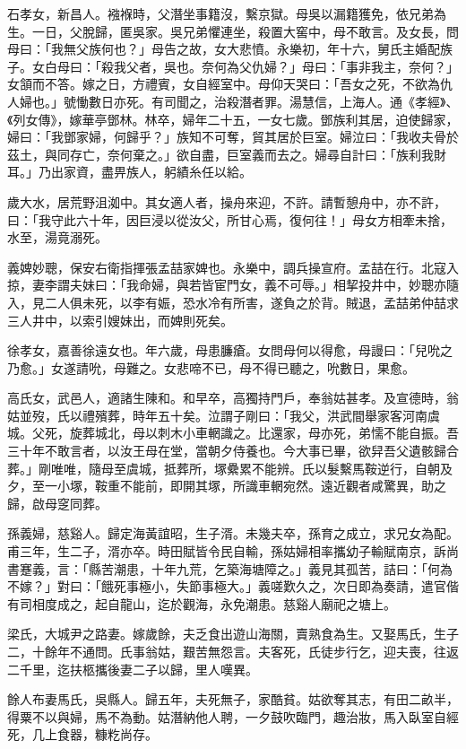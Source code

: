 \begin{pinyinscope}
石孝女，新昌人。襁褓時，父潛坐事籍沒，繫京獄。母吳以漏籍獲免，依兄弟為生。一日，父脫歸，匿吳家。吳兄弟懼連坐，殺置大窖中，母不敢言。及女長，問母曰：「我無父族何也？」母告之故，女大悲憤。永樂初，年十六，舅氏主婚配族子。女白母曰：「殺我父者，吳也。奈何為父仇婦？」母曰：「事非我主，奈何？」女頷而不答。嫁之日，方禮賓，女自經室中。母仰天哭曰：「吾女之死，不欲為仇人婦也。」號慟數日亦死。有司聞之，治殺潛者罪。湯慧信，上海人。通《孝經》、《列女傳》，嫁華亭鄧林。林卒，婦年二十五，一女七歲。鄧族利其居，迫使歸家，婦曰：「我鄧家婦，何歸乎？」族知不可奪，貿其居於巨室。婦泣曰：「我收夫骨於茲土，與同存亡，奈何棄之。」欲自盡，巨室義而去之。婦尋自計曰：「族利我財耳。」乃出家資，盡畀族人，躬績糸任以給。

歲大水，居荒野沮洳中。其女適人者，操舟來迎，不許。請暫憩舟中，亦不許，曰：「我守此六十年，因巨浸以從汝父，所甘心焉，復何往！」母女方相牽未捨，水至，湯竟溺死。

義婢妙聰，保安右衛指揮張孟喆家婢也。永樂中，調兵操宣府。孟喆在行。北寇入掠，妻李謂夫妹曰：「我命婦，與若皆宦門女，義不可辱。」相挈投井中，妙聰亦隨入，見二人俱未死，以李有娠，恐水冷有所害，遂負之於背。賊退，孟喆弟仲喆求三人井中，以索引嫂妹出，而婢則死矣。

徐孝女，嘉善徐遠女也。年六歲，母患臁瘡。女問母何以得愈，母謾曰：「兒吮之乃愈。」女遂請吮，母難之。女悲啼不已，母不得已聽之，吮數日，果愈。

高氏女，武邑人，適諸生陳和。和早卒，高獨持門戶，奉翁姑甚孝。及宣德時，翁姑並歿，氏以禮殯葬，時年五十矣。泣謂子剛曰：「我父，洪武間舉家客河南虞城。父死，旋葬城北，母以刺木小車輞識之。比還家，母亦死，弟懦不能自振。吾三十年不敢言者，以汝王母在堂，當朝夕侍養也。今大事已畢，欲舁吾父遺骸歸合葬。」剛唯唯，隨母至虞城，抵葬所，塚纍累不能辨。氏以髮繫馬鞍逆行，自朝及夕，至一小塚，鞍重不能前，即開其塚，所識車輞宛然。遠近觀者咸驚異，助之歸，啟母窆同葬。

孫義婦，慈谿人。歸定海黃誼昭，生子湑。未幾夫卒，孫育之成立，求兄女為配。甫三年，生二子，湑亦卒。時田賦皆令民自輸，孫姑婦相率攜幼子輸賦南京，訴尚書蹇義，言：「縣苦潮患，十年九荒，乞築海塘障之。」義見其孤苦，詰曰：「何為不嫁？」對曰：「餓死事極小，失節事極大。」義嗟歎久之，次日即為奏請，遣官偕有司相度成之，起自龍山，迄於觀海，永免潮患。慈谿人廟祀之塘上。

梁氏，大城尹之路妻。嫁歲餘，夫乏食出遊山海關，賣熟食為生。又娶馬氏，生子二，十餘年不通問。氏事翁姑，艱苦無怨言。夫客死，氏徒步行乞，迎夫喪，往返二千里，迄扶柩攜後妻二子以歸，里人嘆異。

餘人布妻馬氏，吳縣人。歸五年，夫死無子，家酷貧。姑欲奪其志，有田二畝半，得粟不以與婦，馬不為動。姑潛納他人聘，一夕鼓吹臨門，趣治妝，馬入臥室自經死，几上食器，糠籺尚存。


\end{pinyinscope}
